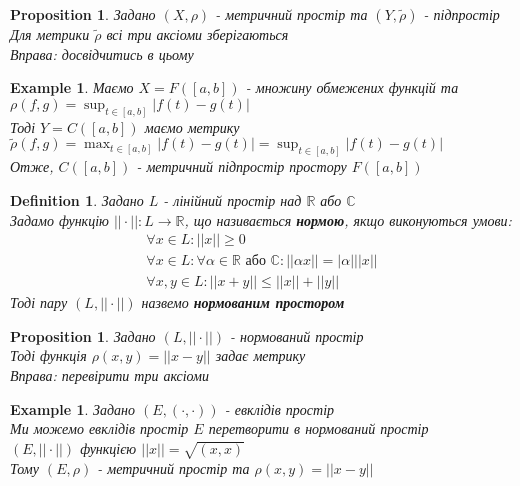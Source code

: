 \documentclass[a4paper, 14pt]{extarticle}
\def\huge{\displaystyle}
\theoremstyle{theoremdd}
\theoremstyle{theoremdd}
\newtheorem{definition}[theorem]{Definition}
\theoremstyle{theoremdd}
\theoremstyle{theoremdd}
\newtheorem{example}[theorem]{Example}
\theoremstyle{theoremdd}
\newtheorem{proposition}[theorem]{Proposition}
\theoremstyle{theoremdd}
\theoremstyle{theoremdd}
\theoremstyle{theoremdd}
\begin{document}
\begin{proposition}
Задано $(X,\rho)$ - метричний простір та $(Y,\tilde{\rho})$ - підпростір\\
Для метрики $\tilde{\rho}$ всі три аксіоми зберігаються\\
\textit{Вправа: досвідчитись в цьому}
\end{proposition}

\begin{example}
Маємо $X = F([a,b])$ - множину обмежених функцій та $\rho(f,g) = \huge \sup_{t \in [a,b]} |f(t)-g(t)|$\\
Тоді $Y = C([a,b])$ маємо метрику \\ $\tilde{\rho}(f,g) = \huge \max_{t \in [a,b]} |f(t)-g(t)| = \huge \sup_{t \in [a,b]} |f(t)-g(t)|$\\
Отже, $C([a,b])$ - метричний підпростір простору $F([a,b])$
\end{example}

\begin{definition}
Задано $L$ - лінійний простір над $\mathbb{R}$ або $\mathbb{C}$\\
Задамо функцію $|| \cdot ||: L \to \mathbb{R}$, що називається \textbf{нормою}, якщо виконуються умови:
\begin{align*}
\forall x \in L: ||x|| \geq 0 \\
\forall x \in L: \forall \alpha \in \mathbb{R} \text{ або } \mathbb{C}: ||\alpha x|| = |\alpha| ||x|| \\
\forall x,y \in L: ||x+y|| \leq ||x|| + ||y||
\end{align*}
Тоді пару $(L, ||\cdot ||)$ назвемо \textbf{нормованим простором}
\end{definition}

\begin{proposition}
Задано $(L, || \cdot ||)$ - нормований простір\\
Тоді функція $\rho(x,y) = ||x-y||$ задає метрику\\
\textit{Вправа: перевірити три аксіоми}
\end{proposition}

\begin{example}
Задано $(E, (\cdot, \cdot))$ - евклідів простір\\
Ми можемо евклідів простір $E$ перетворити в нормований простір \\ $(E, || \cdot ||)$ функцією $||x|| = \sqrt{(x,x)}$\\
Тому $(E, \rho)$ - метричний простір та $\rho(x,y) = ||x-y||$
\end{example}
\end{document}
